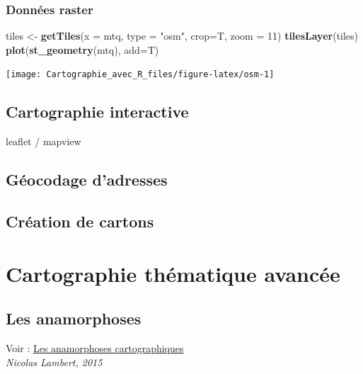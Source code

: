\documentclass[]{book}
\newenvironment{Shaded}{\begin{snugshade}}{\end{snugshade}}
\newcommand{\KeywordTok}[1]{\textcolor[rgb]{0.13,0.29,0.53}{\textbf{#1}}}
\newcommand{\DataTypeTok}[1]{\textcolor[rgb]{0.13,0.29,0.53}{#1}}
\newcommand{\DecValTok}[1]{\textcolor[rgb]{0.00,0.00,0.81}{#1}}
\newcommand{\StringTok}[1]{\textcolor[rgb]{0.31,0.60,0.02}{#1}}
\newcommand{\NormalTok}[1]{#1}
\begin{document}
\subsection{Données raster}\label{donnees-raster}

\begin{Shaded}
\begin{Highlighting}[]
\NormalTok{tiles <-}\StringTok{ }\KeywordTok{getTiles}\NormalTok{(}\DataTypeTok{x =}\NormalTok{ mtq, }\DataTypeTok{type =} \StringTok{"osm"}\NormalTok{, }\DataTypeTok{crop=}\NormalTok{T, }\DataTypeTok{zoom =} \DecValTok{11}\NormalTok{)}
\KeywordTok{tilesLayer}\NormalTok{(tiles)}
\KeywordTok{plot}\NormalTok{(}\KeywordTok{st_geometry}\NormalTok{(mtq), }\DataTypeTok{add=}\NormalTok{T)}
\end{Highlighting}
\end{Shaded}

\begin{center}\texttt{[image: Cartographie\_avec\_R\_files/figure-latex/osm-1]} \end{center}

\section{Cartographie interactive}\label{cartographie-interactive}

leaflet / mapview

\section{Géocodage d'adresses}\label{geocodage-dadresses}

\section{Création de cartons}\label{creation-de-cartons}

\hypertarget{jour3}{\chapter{Cartographie thématique
avancée}\label{jour3}}

\section{Les anamorphoses}\label{les-anamorphoses}

Voir : \href{https://neocarto.hypotheses.org/366}{Les anamorphoses
cartographiques}\\
\emph{Nicolas Lambert, 2015}
\end{document}
